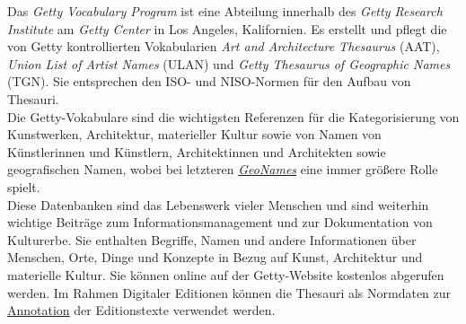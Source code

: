 \documentclass{article}
\begin{document}
    Das \emph{Getty Vocabulary Program} ist eine Abteilung innerhalb des \emph{Getty Research Institute} am \emph{Getty Center} in Los Angeles, Kalifornien. Es erstellt und pflegt die von Getty kontrollierten Vokabularien \emph{Art and Architecture Thesaurus }(AAT), \emph{Union List of Artist Names}  (ULAN) und \emph{Getty Thesaurus of Geographic Names }(TGN). Sie entsprechen den ISO- und NISO-Normen für den Aufbau von Thesauri. \\
            
        Die Getty-Vokabulare sind die wichtigsten Referenzen für die Kategorisierung von Kunstwerken, Architektur, materieller Kultur sowie von Namen von Künstlerinnen und Künstlern, Architektinnen und Architekten sowie geografischen Namen, wobei bei letzteren \emph{\href{http://gams.uni-graz.at/o:konde.107}{GeoNames}} eine immer größere Rolle spielt. \\
            
        Diese Datenbanken sind das Lebenswerk vieler Menschen und sind weiterhin wichtige Beiträge zum Informationsmanagement und zur Dokumentation von Kulturerbe. Sie enthalten Begriffe, Namen und andere Informationen über Menschen, Orte, Dinge und Konzepte in Bezug auf Kunst, Architektur und materielle Kultur. Sie können online auf der Getty-Website kostenlos abgerufen werden. Im Rahmen Digitaler Editionen können die Thesauri als Normdaten zur \href{http://gams.uni-graz.at/o:konde.17}{Annotation} der Editionstexte verwendet werden.\\
            
\end{document}
